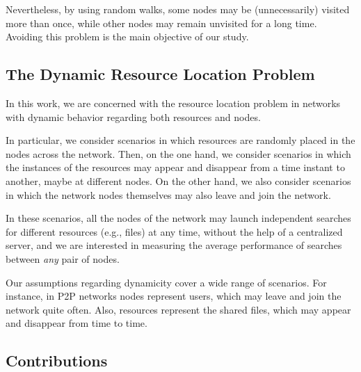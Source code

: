 \documentclass[]{elsarticle}
\begin{document}
Nevertheless, by using random walks, some nodes may be (unnecessarily) visited more than once, while other nodes may remain unvisited for a long time.   Avoiding this problem is the main objective of our study.

\subsection{The Dynamic Resource Location Problem}

In this work, we are concerned with the resource location problem in networks with dynamic behavior regarding both resources and nodes. 

In particular, we consider scenarios in which resources are randomly placed in the nodes across the network. Then, on the one hand, we consider scenarios in which the instances of the resources may appear and disappear from a time instant to another, maybe at different nodes. On the other hand, we also consider scenarios in which the network nodes themselves may also leave and join the network.

In these scenarios, all the nodes of the network may launch independent searches for different resources (e.g., files) at any time, without the help of a centralized server, and we are interested in measuring the average performance of searches between \emph{any} pair of nodes.

Our assumptions regarding dynamicity cover a wide range of scenarios. For instance, in P2P networks nodes represent users, which may leave and join   the network quite often. Also, resources represent the shared files, which may appear and disappear from time to time.


\subsection{Contributions}
\end{document}
